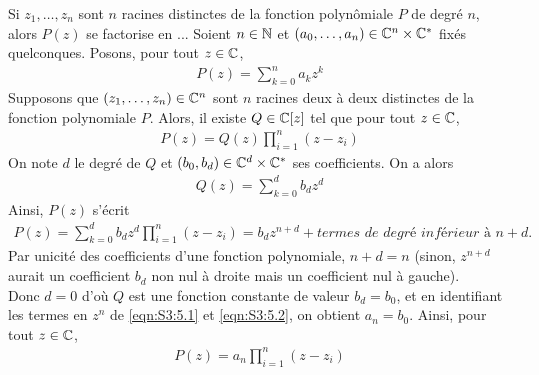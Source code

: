 \documentclass{article}
\renewenvironment{question_kholle}[2][ ]
{
	\subsection{\texorpdfstring{#2}{}}
	\notblank{#1}
	{
		\noindent #1
		\bigbreak
	}
	{}
	\begin{proof}
}
{
	\end{proof}
}
\begin{document}
\begin{question_kholle}{Si $z_1, \dots , z_n$ sont $n$ racines distinctes de la fonction polynômiale $P$ de degré $n$, alors $P(z)$ se factorise en ... }
  Soient $n\in\mathbb N$ et $(a_0,\dots,a_n)\in\mathbb C^n\times\mathbb C^*$ fixés quelconques. Posons, pour tout $z\in\mathbb C$,
  \begin{align}\label{eqn:S3:5.1}
    P(z)=\sum_{k=0}^{n}{a_kz^k}
  \end{align}
  Supposons que $(z_1,\dots,z_n)\in\mathbb C^n$ sont $n$ racines deux à deux distinctes de la fonction polynomiale $P$. Alors, il existe $Q\in\mathbb C[z]$ tel que pour tout $z\in\mathbb C$,
  \begin{align*}
    P(z)=Q(z)\prod_{i=1}^{n}{(z-z_i)}
  \end{align*}
  On note $d$ le degré de $Q$ et $(b_0, b_d)\in\mathbb C^d\times\mathbb C^*$ ses coefficients. On a alors
  \begin{align*}
    Q(z)=\sum_{k=0}^{d}{b_dz^d}
  \end{align*}
  Ainsi, $P(z)$ s'écrit
  \begin{align}\label{eqn:S3:5.2}
    P(z)=\sum_{k=0}^{d}{b_dz^d}\prod_{i=1}^{n}{(z-z_i)} = b_dz^{n+d} + \textit{termes de degré inférieur à $n+d$.}
  \end{align}
  Par unicité des coefficients d'une fonction polynomiale, $n+d=n$ (sinon, $z^{n+d}$ aurait un coefficient $b_d$ non nul à droite mais un coefficient nul à gauche).\\
  Donc $d=0$ d'où $Q$ est une fonction constante de valeur $b_d=b_0$, et en identifiant les termes en $z^n$ de \eqref{eqn:S3:5.1} et \eqref{eqn:S3:5.2}, on obtient $a_n=b_0$. Ainsi, pour tout $z\in\mathbb C$,
  \begin{align*}
    P(z)=a_n\prod_{i=1}^{n}{(z-z_i)}
  \end{align*}
\end{question_kholle}
\end{document}
